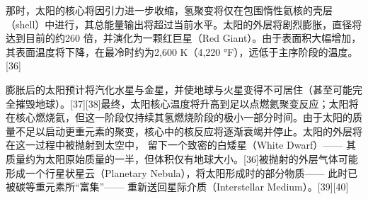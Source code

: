 那时，太阳的核心将因引力进一步收缩，氢聚变将仅在包围惰性氦核的壳层（shell）中进行，其总能量输出将超过当前水平。太阳的外层将剧烈膨胀，直径将达到目前的约260 倍，并演化为一颗红巨星（Red Giant）。由于表面积大幅增加，其表面温度将下降，在最冷时约为2,600 K（4,220 °F），远低于主序阶段的温度。[36]

膨胀后的太阳预计将汽化水星与金星，并使地球与火星变得不可居住（甚至可能完全摧毁地球）。[37][38]最终，太阳核心温度将升高到足以点燃氦聚变反应；太阳将在核心燃烧氦，但这一阶段仅持续其氢燃烧阶段的极小一部分时间。由于太阳的质量不足以启动更重元素的聚变，核心中的核反应将逐渐衰竭并停止。太阳的外层将在这一过程中被抛射到太空中，  
留下一个致密的白矮星（White Dwarf）—— 其质量约为太阳原始质量的一半，但体积仅有地球大小。[36]被抛射的外层气体可能形成一个行星状星云（Planetary Nebula），将太阳形成时的部分物质—— 此时已被碳等重元素所“富集”—— 重新送回星际介质（Interstellar Medium）。[39][40]

